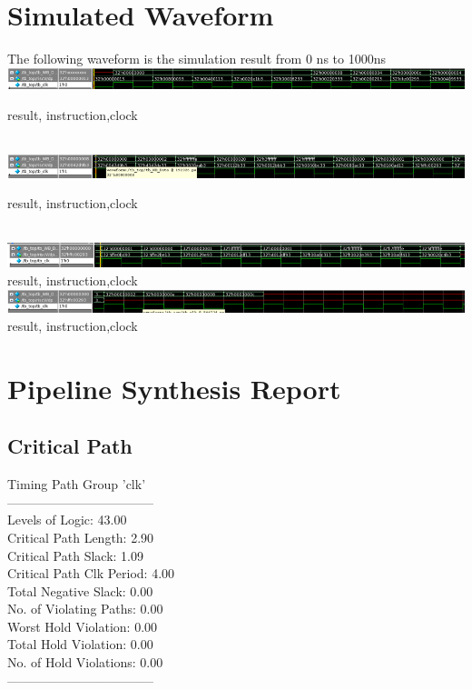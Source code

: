 \documentclass[12pt]{article}
\begin{document}
\section{Simulated Waveform}
The following waveform is the simulation result from 0 ns to 1000ns\\
\includegraphics[width=\linewidth]{1.png}
\centerline{result, instruction,clock}\\
\includegraphics[width=\linewidth]{2.png}
\centerline{result, instruction,clock}\\
\includegraphics[width=\linewidth]{3.png}
result, instruction,clock\\
\includegraphics[width=\linewidth]{4.png}
result, instruction,clock\\
\section{Pipeline Synthesis Report}
\subsection{Critical Path}
  Timing Path Group 'clk'\\
  -----------------------------------\\
  Levels of Logic:              43.00\\
  Critical Path Length:          2.90\\
  Critical Path Slack:           1.09\\
  Critical Path Clk Period:      4.00\\
  Total Negative Slack:          0.00\\
  No. of Violating Paths:        0.00\\
  Worst Hold Violation:          0.00\\
  Total Hold Violation:          0.00\\
  No. of Hold Violations:        0.00\\
  -----------------------------------\\
\end{document}
